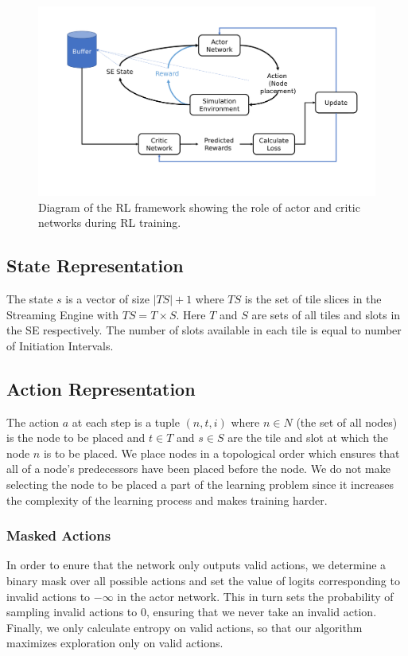 \begin{figure}[h]
  \centering
  \includegraphics[width=\linewidth]{fig/ppo.pdf}
  \caption{Diagram of the RL framework showing the role of actor and critic networks during RL training. }
  \label{fig:ppo}
\end{figure}

\subsection{State Representation}
The state $s$ is a vector of size $|TS|+1$ where $TS$ is the set of tile slices in the Streaming Engine with $TS=T \times S$. Here $T$ and $S$ are sets of all tiles and slots in the SE respectively. The number of slots available in each tile is equal to number of Initiation Intervals.

\subsection{Action Representation}
The action $a$ at each step is a tuple \((n,t,i)\) where $n \in N$ (the set of all nodes) is the node to be placed and $t \in T$ and $s \in S$ are the tile and slot at which the node $n$ is to be placed. 
We place nodes in a topological order which ensures that all of a node's predecessors have been placed before the node. 
We do not make selecting the node to be placed a part of the learning problem since it increases the complexity of the learning process and makes training harder.

\subsubsection{Masked Actions}
In order to enure that the network only outputs valid actions, we determine a binary mask over all possible actions and set the value of logits corresponding to invalid actions to $-\infty$ in the actor network. 
This in turn sets the probability of sampling invalid actions to $0$, ensuring that we never take an invalid action.
Finally, we only calculate entropy on valid actions, so that our algorithm maximizes exploration only on valid actions.

